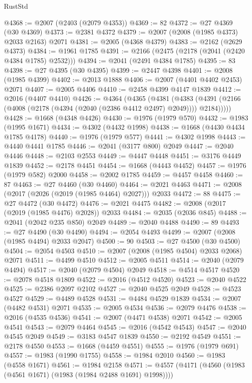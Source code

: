\begin{lexlean}{RustStd}
\begin{coremodule}
@4368 := @2007 (@2403 (@2079 @4353))
@4369 := 82
@4372 := @27 @4369 (@30 @4369)
@4373 := @2381 @4372
@4379 := @2007 (@2008 (@1985 @4373) @2033 @2163) @2071
@4381 := @2005 (@4368 @4379)
@4383 := @2162 (@2629 @4373)
@4384 := @1961 @1785
@4391 := @2166 (@2475 (@2178 (@2041 (@2420 @4384 @1785) @2532)))
@4394 := @2041 (@2491 @4384 @1785)
@4395 := 83
@4398 := @27 @4395 (@30 @4395)
@4399 := @2447 @4398
@4401 := @2008 (@1985 @4399)
@4402 := @2013 @1888
@4406 := @2007 (@4401 @4402 @2453) @2071
@4407 := @2005 @4406
@4410 := @2458 @4399 @4147 @1839
@4412 := @2016 (@4407 @4410)
@4426 := @4364
    (@4365
      (@4381
        (@4383 (@4391 (@2166 (@4008 (@2178 (@4394 (@2040 (@2386 @4412 @2497) @2049)))) @2184)))))
@4428 := @1668 (@4348 @4426)
@4430 := @1976 (@1979 @570)
@4432 := @1983 (@1995 @1671)
@4434 := @4302 (@4432 @1998)
@4438 := @1668 (@4430 @4434 @1785 @4178)
@4440 := @1976 (@1979 @577)
@4441 := @4302 @1998
@4443 := @4440 @4441 @1785
@4446 := @2041 (@3177 @800) @2049
@4447 := @2040 @4446
@4448 := @2103 @2553
@4449 := @4447 @4448
@4451 := @3176 @4449 @1839
@4452 := @2178 @4451
@4454 := @1668 (@4443 @4452)
@4457 := @1976 (@1979 @582) @2000
@4458 := @2002 @1785
@4459 := @4457 @4458
@4460 := 87
@4463 := @27 @4460 (@30 @4460)
@4464 := @2021 @4463
@4471 := @2008 (@2017 (@2026 (@2019 (@1985 @4464) @2027))) @2033
@4472 := 88
@4475 := @27 @4472 (@30 @4472)
@4476 := @2021 @4475
@4482 := @2008 (@2017 (@2019 (@1985 @4476) @2028)) @2033
@4484 := @2035 (@2036 @845)
@4488 := @2041 (@2042 @235 @850) @2049
@4489 := @2040 @4488
@4490 := 89
@4493 := @27 @4490 (@30 @4490)
@4494 := @2054 @4493
@4499 := @2007 (@2008 (@1985 @4494) @2033 @2047)
@4500 := 90
@4503 := @27 @4500 (@30 @4500)
@4504 := @2054 @4503
@4510 := @2007 (@2008 (@1985 @4504) @2033 @2068) @2071
@4511 := @4499 @4510
@4512 := @2005 @4511
@4514 := @2040 (@2079 @4494)
@4517 := @2040 (@2079 @4504) @2049
@4518 := @4514 @4517
@4520 := @2078 @4518 @1809
@4522 := @2016 (@4512 @4520)
@4523 := @2040 @4522
@4525 := @2386 @2097 @2102
@4527 := @2040 @4525 @2049
@4528 := @4523 @4527
@4529 := @4489 @4528
@4531 := @4484 @4529 @1839
@4534 := @2007 (@4482 @4531) @2071
@4535 := @2005 @4534
@4536 := @2079 @4476
@4538 := @2016 (@4535 @4536)
@4541 := @2007 (@4471 @4538) @2071
@4542 := @2005 @4541
@4543 := @2079 @4464
@4545 := @2016 (@4542 @4543)
@4547 := @2040 @4545 @2049
@4549 := @3183 @4547 @1839
@4550 := @2192 @4549
@4551 := @2178 @4550
@4553 := @1668 (@4459 @4551)
@4555 := @1976 (@1979 @691)
@4557 := @1983 (@1990 @1755)
@4558 := @1984 @2010
@4560 := @1983 (@4558 @1671)
@4561 := @1984 @2158
@4571 := @4557 (@4171 (@4560 (@1983 (@4561 @1671) (@1983 (@1984 @2488 @1691) @1998))))

\end{coremodule}
\end{lexlean}
